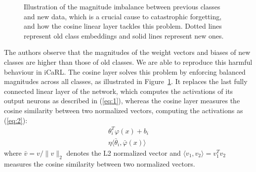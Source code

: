 \documentclass[10pt,twocolumn,letterpaper]{article}
\begin{document}
\begin{figure}
\begin{center}
\end{center}
\caption{Illustration of the magnitude imbalance between previous classes and new data, which is a crucial cause to catastrophic forgetting, and how the cosine linear layer tackles this problem. Dotted lines represent old class embeddings and solid lines represent new ones.}
\label{fig:classifier:cosine:features}
\end{figure}

The authors observe that the magnitudes of the weight vectors and biases of new classes are higher than those of old classes. We are able to reproduce this harmful behaviour in iCaRL. The cosine layer solves this problem by enforcing balanced magnitudes across all classes, as illustrated in Figure~\ref{fig:classifier:cosine:features}. It replaces the last fully connected linear layer of the network, which computes the activations of its output neurons as described in (\ref{eq:1}), whereas the cosine layer measures the cosine similarity between two normalized vectors, computing the activations as (\ref{eq:2}):
\begin{align}
    \theta_{i}^{T} \varphi(x) + b_{i} \label{eq:1}\\
    \eta \langle \bar{\theta}_{i}, \bar{\varphi}(x) \rangle \label{eq:2}
\end{align}
where $\bar{v} = v/\lVert v \rVert_{2}$ denotes the L2 normalized vector and $\langle v_{1}, v_{2} \rangle = v_{1}^{T} v_{2}$ measures the cosine similarity between two normalized vectors.
\end{document}
